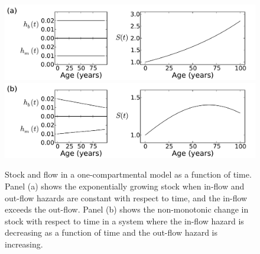 \begin{figure}[h]
\begin{center}
\includegraphics[width=\textwidth]{one_compartment_constant_rate.pdf}
\includegraphics[width=\textwidth]{one_compartment_varying_rate.pdf}
\caption{Stock and flow in a one-compartmental model as a function of
  time. Panel (a) shows the exponentially growing stock when in-flow
  and out-flow hazards are constant with respect to time, and the in-flow
  exceeds the out-flow.  Panel (b) shows the non-monotonic change
  in stock with respect to time in a system where the in-flow hazard is
  decreasing as a function of time and the out-flow hazard is
  increasing.}
\label{forward-sim-one-compartment-soln}
\end{center}
\end{figure}



